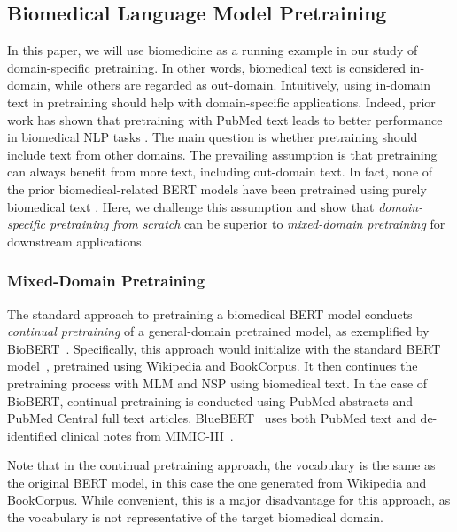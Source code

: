 \documentclass[acmlarge,screen,nonacm]{acmart}
\begin{document}
\subsection{Biomedical Language Model Pretraining}
\label{sec:domain}

In this paper, we will use biomedicine as a running example in our study of domain-specific pretraining. In other words, biomedical text is considered in-domain, while others are regarded as out-domain. 
Intuitively, using in-domain text in pretraining should help with domain-specific applications. Indeed, prior work has shown that pretraining with PubMed text leads to better performance in biomedical NLP tasks \cite{lee2019bioberts,beltagy2019scibert,peng2019transfer}. 
The main question is whether pretraining should include text from other domains. 
The prevailing assumption is that pretraining can always benefit from more text, including out-domain text. In fact, none of the prior biomedical-related BERT models have been pretrained using purely biomedical text \cite{lee2019bioberts,beltagy2019scibert,peng2019transfer}. 
Here, we challenge this assumption and show that {\em domain-specific pretraining from scratch} can be superior to {\em mixed-domain pretraining} for downstream applications.

\subsubsection{Mixed-Domain Pretraining}

The standard approach to pretraining a biomedical BERT model conducts {\em continual pretraining} of a general-domain pretrained model, as exemplified by BioBERT~\cite{lee2019bioberts}. 
Specifically, this approach would initialize with the standard BERT model~\cite{devlin2018bert}, pretrained using Wikipedia and BookCorpus. It then continues the pretraining process with MLM and NSP using biomedical text. 
In the case of BioBERT, continual pretraining is conducted using PubMed abstracts and PubMed Central full text articles. BlueBERT~\cite{peng2019transfer} uses both PubMed text and de-identified clinical notes from MIMIC-III~\cite{mimic}. 

Note that in the continual pretraining approach, the vocabulary is the same as the original BERT model, in this case the one generated from Wikipedia and BookCorpus. While convenient, this is a major disadvantage for this approach, as the vocabulary is not representative of the target biomedical domain.
\end{document}
